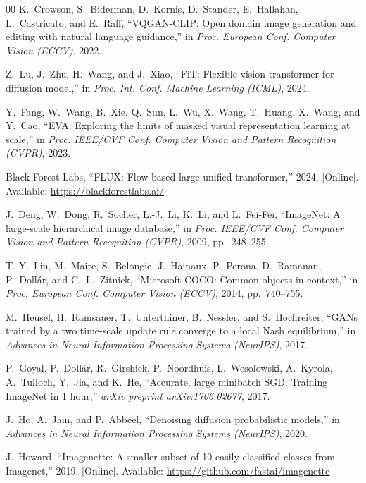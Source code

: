 \documentclass[conference]{IEEEtran}
\begin{document}
\begin{thebibliography}{00}
K.~Crowson, S.~Biderman, D.~Kornis, D.~Stander, E.~Hallahan, L.~Castricato, and E.~Raff, ``VQGAN-CLIP: Open domain image generation and editing with natural language guidance,'' in \emph{Proc. European Conf. Computer Vision (ECCV)}, 2022.

Z.~Lu, J.~Zhu, H.~Wang, and J.~Xiao, ``FiT: Flexible vision transformer for diffusion model,'' in \emph{Proc. Int. Conf. Machine Learning (ICML)}, 2024.

Y.~Fang, W.~Wang, B.~Xie, Q.~Sun, L.~Wu, X.~Wang, T.~Huang, X.~Wang, and Y.~Cao, ``EVA: Exploring the limits of masked visual representation learning at scale,'' in \emph{Proc. IEEE/CVF Conf. Computer Vision and Pattern Recognition (CVPR)}, 2023.

Black Forest Labs, ``FLUX: Flow-based large unified transformer,'' 2024. [Online]. Available: \url{https://blackforestlabs.ai/}

J.~Deng, W.~Dong, R.~Socher, L.-J.~Li, K.~Li, and L.~Fei-Fei, ``ImageNet: A large-scale hierarchical image database,'' in \emph{Proc. IEEE/CVF Conf. Computer Vision and Pattern Recognition (CVPR)}, 2009, pp.~248--255.

T.-Y.~Lin, M.~Maire, S.~Belongie, J.~Hainaux, P.~Perona, D.~Ramanan, P.~Doll\'{a}r, and C.~L.~Zitnick, ``Microsoft COCO: Common objects in context,'' in \emph{Proc. European Conf. Computer Vision (ECCV)}, 2014, pp.~740--755.

M.~Heusel, H.~Ramsauer, T.~Unterthiner, B.~Nessler, and S.~Hochreiter, ``GANs trained by a two time-scale update rule converge to a local Nash equilibrium,'' in \emph{Advances in Neural Information Processing Systems (NeurIPS)}, 2017.

P.~Goyal, P.~Doll\'{a}r, R.~Girshick, P.~Noordhuis, L.~Wesolowski, A.~Kyrola, A.~Tulloch, Y.~Jia, and K.~He, ``Accurate, large minibatch SGD: Training ImageNet in 1 hour,'' \emph{arXiv preprint arXiv:1706.02677}, 2017.

J.~Ho, A.~Jain, and P.~Abbeel, ``Denoising diffusion probabilistic models,'' in \emph{Advances in Neural Information Processing Systems (NeurIPS)}, 2020.

J.~Howard, ``Imagenette: A smaller subset of 10 easily classified classes from Imagenet,'' 2019. [Online]. Available: \url{https://github.com/fastai/imagenette}

\end{thebibliography}
\end{document}
